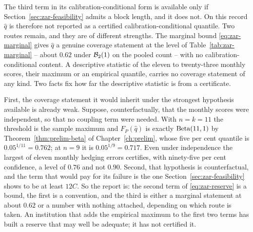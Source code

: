 \documentclass[../../../main.tex]{subfiles}
\begin{document}
The third term in its calibration-conditional form is available only if Section~\ref{sec:zar-feasibility} admits a block length, and it does not. On this record $\hat q$ is therefore not reported as a certified calibration-conditional quantile. Two routes remain, and they are of different strengths. The marginal bound \eqref{eq:zar-marginal} gives $\hat q$ a genuine coverage statement at the level of Table~\ref{tab:zar-marginal} -- about $0.62$ under $\mathcal B_{2}(1)$ on the pooled count -- with no calibration-conditional content. A descriptive statistic of the eleven to twenty-three monthly scores, their maximum or an empirical quantile, carries no coverage statement of any kind. Two facts fix how far the descriptive statistic is from a certificate.

First, the coverage statement it would inherit under the strongest hypothesis available is already weak. Suppose, counterfactually, that the monthly scores were independent, so that no coupling term were needed. With $n=k=11$ the threshold is the sample maximum and $F_P(\hat q)$ is exactly $\operatorname{Beta}(11,1)$ by Theorem~\ref{thm:prelim-beta} of Chapter~\ref{ch:prelim}, whose five per cent quantile is $0.05^{1/11}=0.762$; at $n=9$ it is $0.05^{1/9}=0.717$. Even under independence the largest of eleven monthly hedging errors certifies, with ninety-five per cent confidence, a level of $0.76$ and not $0.90$. Second, that hypothesis is counterfactual, and the term that would pay for its failure is the one Section~\ref{sec:zar-feasibility} shows to be at least $12C$. So the report is: the second term of \eqref{eq:zar-reserve} is a bound, the first is a convention, and the third is either a marginal statement at about $0.62$ or a number with nothing attached, depending on which route is taken. An institution that adds the empirical maximum to the first two terms has built a reserve that may well be adequate; it has not certified it.
\end{document}
